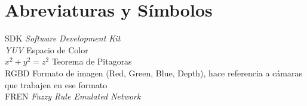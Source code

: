 \chapter*{Abreviaturas y Símbolos}

\noindent SDK \hspace{20mm} \emph {Software Development Kit}\\
\emph{YUV} \hspace{20mm} Espacio de Color\\
\(x^2 + y^2 = z^2\) \hspace{5mm} Teorema de Pitagoras\\
\noindent RGBD \hspace{20mm} Formato de imagen (Red, Green, Blue, Depth), hace referencia a cámaras que trabajen en ese formato\\
\noindent FREN \hspace{20mm} \emph{Fuzzy Rule Emulated Network}